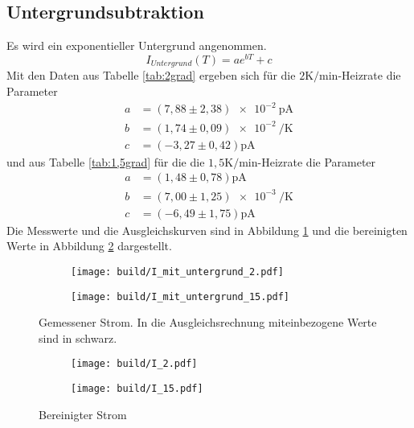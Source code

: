 \subsection{Untergrundsubtraktion}
Es wird ein exponentieller Untergrund angenommen.
\begin{equation}
  I_{Untergrund}(T) = ae^{bT}+c
\end{equation}
Mit den Daten aus Tabelle \ref{tab:2grad} ergeben sich für die $2\si{\kelvin\per\minute}$-Heizrate die Parameter
\begin{align}
  a &= (7,88\pm 2,38)\SI{e-2}{\pico\ampere} \nonumber\\
  b &= (1,74\pm 0,09)\SI{e-2}{\per\kelvin} \nonumber\\
  c &= (-3,27\pm 0,42)\si{\pico\ampere}
\end{align}
und aus Tabelle \ref{tab:1,5grad} für die die $1,5\si{\kelvin\per\minute}$-Heizrate die Parameter
\begin{align}
  a &= (1,48\pm 0,78)\si{\pico\ampere} \nonumber\\
  b &= (7,00\pm 1,25)\SI{e-3}{\per\kelvin} \nonumber\\
  c &= (-6,49\pm 1,75)\si{\pico\ampere}
\end{align}
Die Messwerte und die Ausgleichskurven sind in Abbildung \ref{fig:Mit_Untergrund} und die bereinigten Werte in Abbildung \ref{fig:Bereinigt} dargestellt.
\begin{figure}
  \centering
  \begin{subfigure}{0.4\textwidth}
    \centering
    \texttt{[image: build/I\_mit\_untergrund\_2.pdf]}
  \end{subfigure}
  \begin{subfigure}{0.4\textwidth}
    \centering
    \texttt{[image: build/I\_mit\_untergrund\_15.pdf]}
  \end{subfigure}
  \caption{Gemessener Strom. In die Ausgleichsrechnung miteinbezogene Werte sind in schwarz.}
  \label{fig:Mit_Untergrund}
\end{figure}

\begin{figure}
  \centering
  \begin{subfigure}{0.4\textwidth}
    \centering
    \texttt{[image: build/I\_2.pdf]}
  \end{subfigure}
  \begin{subfigure}{0.4\textwidth}
    \centering
    \texttt{[image: build/I\_15.pdf]}
  \end{subfigure}
  \caption{Bereinigter Strom}
  \label{fig:Bereinigt}
\end{figure}

